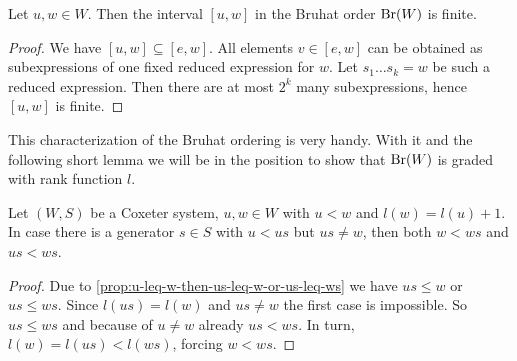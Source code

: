 \begin{coro}
	Let $u,w \in W$. Then the interval $[u,w]$ in the Bruhat order $\operatorname{Br}(W)$ is finite.

	\begin{proof}
		We have $[u,w] \subseteq [e,w]$. All elements $v \in [e,w]$ can be obtained as subexpressions of one fixed reduced expression for $w$. Let $s_1 \ldots s_k = w$ be such a reduced expression. Then there are at most $2^k$ many subexpressions, hence $[u,w]$ is finite.
	\end{proof}
\end{coro}

This characterization of the Bruhat ordering is very handy. With it and the following short lemma we will be in the position to show that $\operatorname{Br}(W)$ is graded with rank function $l$.

\begin{lemm}
	Let $(W,S)$ be a Coxeter system, $u,w \in W$ with $u < w$ and $l(w) = l(u) + 1$. In case there is a generator $s \in S$ with $u < us$ but $us \neq w$, then both $w < ws$ and $us < ws$.

	\begin{proof}
		Due to \ref{prop:u-leq-w-then-us-leq-w-or-us-leq-ws} we have $us \leq w$ or $us \leq ws$. Since $l(us) = l(w)$ and $us \neq w$ the first case is impossible. So $us \leq ws$ and because of $u \neq w$ already $us < ws$. In turn, $l(w) = l(us) < l(ws)$, forcing $w < ws$.
	\end{proof}
\end{lemm}

